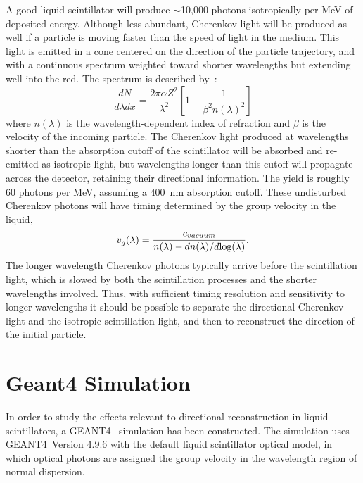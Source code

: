\documentclass[aps,prc,twocolumn,groupedaddress,showpacs,amsmath,amssymb,floatfix,superscriptaddress]{revtex4}
\newcommand{\GEANT}{GEANT4}
\begin{document}
A good liquid scintillator will produce $\sim$10,000 photons
isotropically per MeV of deposited energy. Although less abundant,
Cherenkov light will be produced as well if a particle is moving faster
than the speed of light in the medium.  This light is emitted in a
cone centered on the direction of the particle trajectory, and with a
continuous spectrum weighted toward shorter wavelengths
but extending well into the red. The spectrum is described by~\cite{Cherenkov34}:
\begin{equation}
\label{eqCherenkov}
\frac{dN}{d\lambda dx} = \frac{2 \pi \alpha Z^2}{\lambda^2} \left [ 1 - \frac{1}{\beta^2 n(\lambda)^2} \right ]
\end{equation}
where $n(\lambda)$ is the wavelength-dependent index of refraction and
$\beta$ is the velocity of the incoming particle. The Cherenkov light
produced at wavelengths shorter than the absorption cutoff of the
scintillator will be absorbed and re-emitted as isotropic light, but
wavelengths longer than this cutoff will propagate across the
detector, retaining their directional information. The yield is
roughly 60 photons per MeV, assuming a 400~nm absorption
cutoff\cite{qdot}. These undisturbed Cherenkov photons will have timing
determined by the group velocity \cite{group_velocity_article} in the liquid,
\begin{equation}
\label{eqGroup}
v_{g}(\lambda) = \frac{c_{vacuum}}{n(\lambda) - dn(\lambda)/d\textnormal{log}(\lambda)}.
\end{equation}
The longer wavelength Cherenkov photons typically arrive before
the scintillation light, which is slowed by both the scintillation
processes and the shorter wavelengths involved. Thus, with sufficient
timing resolution and sensitivity to longer wavelengths it should be
possible to separate the directional Cherenkov light and the isotropic
scintillation light, and then to reconstruct the direction of the
initial particle.

\section{Geant4 Simulation}
In order to study the effects relevant to directional
reconstruction in liquid scintillators, a 
\GEANT~\cite{geant4one,geant4two} simulation has been constructed. The 
simulation uses \GEANT~Version 4.9.6 with the default liquid scintillator optical model, in which optical photons are
assigned the group velocity in the wavelength region of normal
dispersion.
\end{document}
